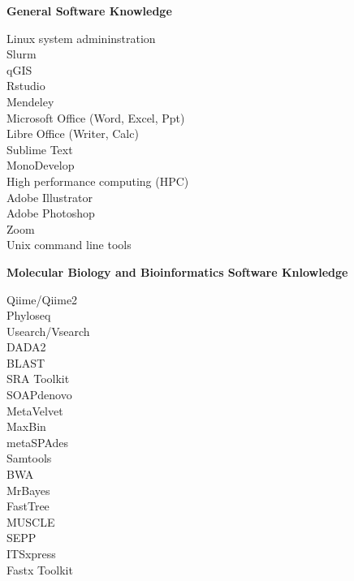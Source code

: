 \documentclass{article}
\begin{document}
\vspace{3mm}

{\large  \textbf{General Software Knowledge}}
  \begin{adjustwidth}{2mm}{}\begin{multicols}{3}
    Linux system admininstration\\
    Slurm\\
    qGIS\\
    Rstudio\\
    Mendeley\\
    Microsoft Office (Word, Excel, Ppt)\\
    Libre Office (Writer, Calc)\\
    Sublime Text\\
    MonoDevelop\\
    High performance computing (HPC)\\
    Adobe Illustrator\\
    Adobe Photoshop\\
    Zoom\\
    Unix command line tools
  \end{multicols}\end{adjustwidth}

\vspace{3mm}
{\large  \textbf{Molecular Biology and Bioinformatics Software Knlowledge}}
  \begin{adjustwidth}{2mm}{}\begin{multicols}{3}
    Qiime/Qiime2\\
    Phyloseq\\
    Usearch/Vsearch\\
    DADA2\\
    BLAST\\
    SRA Toolkit\\
    SOAPdenovo\\
    MetaVelvet\\
    MaxBin\\
    metaSPAdes\\
    Samtools\\
    BWA\\
    MrBayes\\
    FastTree\\
    MUSCLE\\
    SEPP\\
    ITSxpress\\
    Fastx Toolkit
  \end{multicols}\end{adjustwidth}
\end{document}
